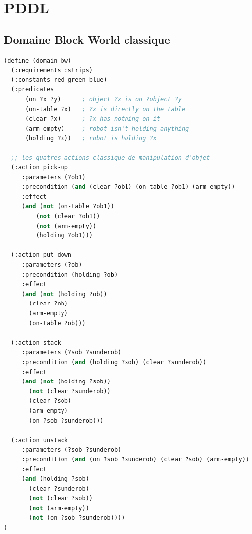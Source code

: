 \section{PDDL}\label{append_pddl}

\subsection{Domaine Block World classique}\label{domain_bw}
\begin{lstlisting}[language=Lisp,basicstyle=\ttfamily\footnotesize]
(define (domain bw)
  (:requirements :strips)
  (:constants red green blue)
  (:predicates
      (on ?x ?y)      ; object ?x is on ?object ?y
      (on-table ?x)   ; ?x is directly on the table
      (clear ?x)      ; ?x has nothing on it
      (arm-empty)     ; robot isn't holding anything
      (holding ?x))   ; robot is holding ?x

  ;; les quatres actions classique de manipulation d'objet
  (:action pick-up
     :parameters (?ob1)
     :precondition (and (clear ?ob1) (on-table ?ob1) (arm-empty))
     :effect
     (and (not (on-table ?ob1))
  	     (not (clear ?ob1))
	     (not (arm-empty))
	     (holding ?ob1)))

  (:action put-down
     :parameters (?ob)
     :precondition (holding ?ob)
     :effect
     (and (not (holding ?ob))
	   (clear ?ob)
	   (arm-empty)
	   (on-table ?ob)))

  (:action stack
     :parameters (?sob ?sunderob)
     :precondition (and (holding ?sob) (clear ?sunderob))
     :effect
     (and (not (holding ?sob))
	   (not (clear ?sunderob))
	   (clear ?sob)
	   (arm-empty)
	   (on ?sob ?sunderob)))

  (:action unstack
     :parameters (?sob ?sunderob)
     :precondition (and (on ?sob ?sunderob) (clear ?sob) (arm-empty))
     :effect
     (and (holding ?sob)
	   (clear ?sunderob)
	   (not (clear ?sob))
	   (not (arm-empty))
	   (not (on ?sob ?sunderob))))
)
    \end{lstlisting}

